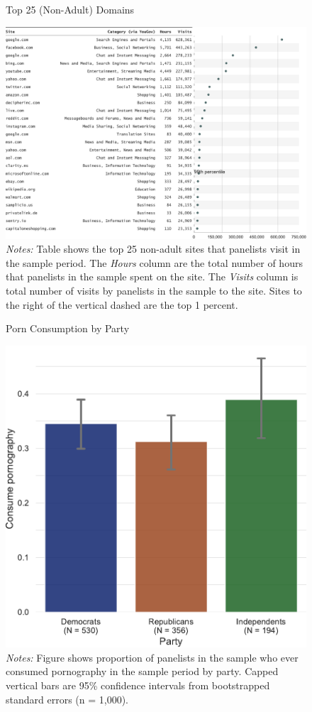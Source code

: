 \documentclass[12pt, letterpaper]{article}
\begin{document}
\begin{figure}
	\centering
	\caption{Top 25 (Non-Adult) Domains}
	\includegraphics[width=\textwidth]{../figs/top_25_nonadultsites.pdf}
	\caption*{\footnotesize \emph{Notes:} 
		Table shows the top 25 non-adult sites that panelists visit in the sample period.
		The \emph{Hours} column are the total number of hours that panelists in the sample spent on the site. 
		The \emph{Visits} column is total number of visits by panelists in the sample to the site.  			
		Sites to the right of the vertical dashed are the top 1 percent.
	}
	\label{fig:top25_nonadult}
\end{figure}



\begin{figure}
	\centering
	\caption{Porn Consumption by Party}
	\includegraphics[width=.5\textwidth]{../figs/consume_porn_yes_no.pdf}
	\caption*{\footnotesize \emph{Notes:} 
		Figure shows proportion of panelists in the sample who ever consumed pornography in the sample period by party.
		Capped vertical bars are 95\% confidence intervals from bootstrapped standard errors (n = 1,000).
	}
	\label{fig:consume_porn_yes_no}
\end{figure}
\end{document}
